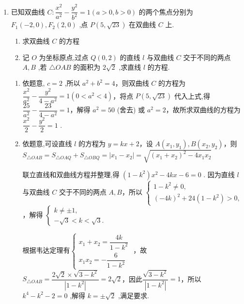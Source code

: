 \begin{enumerate}
\begin{enumerate}
        \item 已知双曲线 $C : \dfrac{{x}^{2}}{{a}^{2}} - \dfrac{{y}^{2}}{{b}^{2}} = 1\left( {a > 0,b > 0}\right)$ 的两个焦点分别为 ${F}_{1}\left( {-2,0}\right) ,{F}_{2}\left( {2,0}\right)$ ,点 $P\left( {5,\sqrt{23}}\right)$ 在双曲线 $C$ 上.
        \begin{enumerate}
            \item 求双曲线 $C$ 的方程
            \item 记 $O$ 为坐标原点,过点 $Q\left( {0,2}\right)$ 的直线 $l$ 与双曲线 $C$ 交于不同的两点 $A,B$ ,若 $\bigtriangleup {OAB}$ 的面积为 $2\sqrt{2}$ ,求直线 $l$ 的方程.
        \end{enumerate}
        \begin{jieda}
            \begin{enumerate}
                \item 依题意, $c = 2$ ,所以 ${a}^{2} + {b}^{2} = 4$，则双曲线 $C$ 的方程为 $\dfrac{{x}^{2}}{{a}^{2}} - \dfrac{{y}^{2}}{4 - {a}^{2}} = 1\left( {0 < {a}^{2} < 4}\right)$，将点 $P\left( {5,\sqrt{23}}\right)$ 代入上式,得 $\dfrac{25}{{a}^{2}} - \dfrac{23}{4 - {a}^{2}} = 1$，解得 ${a}^{2} = {50}$ (舍去) 或 ${a}^{2} = 2$，故所求双曲线的方程为 $\dfrac{{x}^{2}}{2} - \dfrac{{y}^{2}}{2} = 1$ .
                \item 依题意,可设直线 $l$ 的方程为 $y = {kx} + 2$，设 $A\left( {{x}_{1},{y}_{1}}\right) ,B\left( {{x}_{2},{y}_{2}}\right)$，则 $S_{\bigtriangleup {OAB}} =S_{\triangle OAQ}
                + S_{\triangle OBQ}= |x_1-x_2| = \sqrt{{\left( {x}_{1} + {x}_{2}\right) }^{2} - 4{x}_{1}{x}_{2}}$
                
                联立直线和双曲线方程并整理,得 $\left( {1 - {k}^{2}}\right) {x}^{2} - {4kx} - 6 = 0$ . 因为直线 $l$ 与双曲线 $C$ 交于不同的两点 $A,B$，所以 $\left\{  \begin{array}{l} 1 - {k}^{2} \neq  0, \\  {\left( -4k\right) }^{2} + {24}\left( {1 - {k}^{2}}\right)  > 0, \end{array}\right.$，解得 $\left\{  \begin{array}{l} k \neq   \pm  1, \\   - \sqrt{3} < k < \sqrt{3}. \end{array}\right.$
                
                根据韦达定理有$\left\{\begin{array}{l}
                    x_1 + x_2 = \dfrac{4k}{1 - {k}^{2}}  \\
                    x_1x_2 =  - \dfrac{6}{1 - {k}^{2}} 
                \end{array}\right.$ ，故$S_{\bigtriangleup {OAB}} = \dfrac{2\sqrt{2} \times  \sqrt{3 - {k}^{2}}}{\left| 1 - {k}^{2}\right| } = 2\sqrt{2}$，因此$\dfrac{\sqrt{3 - {k}^{2}}}{\left| 1 - {k}^{2}\right| } = 1$，所以 ${k}^{4} - {k}^{2} - 2 = 0$ ,解得 $k =  \pm  \sqrt{2}$ ,满足要求.
                

\end{enumerate}
\end{jieda}
\end{enumerate}
\end{enumerate}
